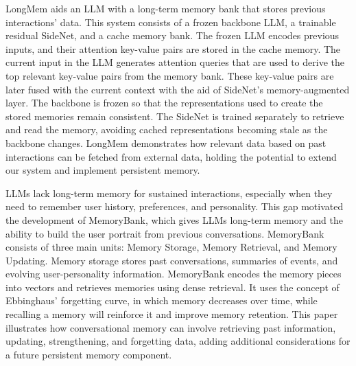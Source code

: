 LongMem aids an LLM with a long-term memory bank that stores previous interactions' data. This system consists of a frozen backbone LLM, a trainable residual SideNet, and a cache memory bank. The frozen LLM encodes previous inputs, and their attention key-value pairs are stored in the cache memory. The current input in the LLM generates attention queries that are used to derive the top relevant key-value pairs from the memory bank. These key-value pairs are later fused with the current context with the aid of SideNet's memory-augmented layer. The backbone is frozen so that the representations used to create the stored memories remain consistent. The SideNet is trained separately to retrieve and read the memory, avoiding cached representations becoming stale as the backbone changes. LongMem demonstrates how relevant data based on past interactions can be fetched from external data, holding the potential to extend our system and implement persistent memory. \cite{wang2023longmem}

LLMs lack long-term memory for sustained interactions, especially when they need to remember user history, preferences, and personality. This gap motivated the development of MemoryBank, which gives LLMs long-term memory and the ability to build the user portrait from previous conversations. MemoryBank consists of three main units: Memory Storage, Memory Retrieval, and Memory Updating. Memory storage stores past conversations, summaries of events, and evolving user-personality information. MemoryBank encodes the memory pieces into vectors and retrieves memories using dense retrieval. It uses the concept of Ebbinghaus' forgetting curve, in which memory decreases over time, while recalling a memory will reinforce it and improve memory retention. This paper illustrates how conversational memory can involve retrieving past information, updating, strengthening, and forgetting data, adding additional considerations for a future persistent memory component. \cite{zhong2024memorybank}

